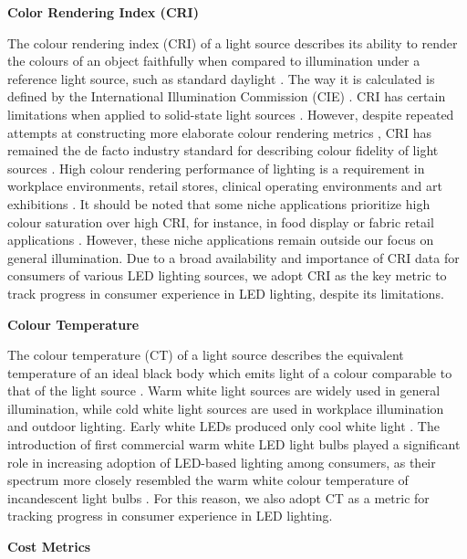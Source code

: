 \documentclass[parskip=full]{article}
\begin{document}
\textbf{Color Rendering Index (CRI)}

The colour rendering index (CRI) of a light source describes its ability to render the colours of an object faithfully when compared to illumination under a reference light source, such as standard daylight \cite{khan2015led}. The way it is calculated is defined by the International Illumination Commission (CIE) \cite{cie_cri_1995}. CRI has certain limitations when applied to solid-state light sources \cite{david2013cri}. However, despite repeated attempts at constructing more elaborate colour rendering metrics \cite{Houser2013}, CRI has remained the de facto industry standard for describing colour fidelity of light sources \cite{DoE2016LED}. High colour rendering performance of lighting is a requirement in workplace environments, retail stores, clinical operating environments and art exhibitions \cite{khanh2017color}. It should be noted that some niche applications prioritize high colour saturation over high CRI, for instance, in food display or fabric retail applications \cite{david2013cri}. However, these niche applications remain outside our focus on general illumination. Due to a broad availability and importance of CRI data for consumers of various LED lighting sources, we adopt CRI as the key metric to track progress in consumer experience in LED lighting, despite its limitations.

\textbf{Colour Temperature}

The colour temperature (CT) of a light source describes the equivalent temperature of an ideal black body which emits light of a colour comparable to that of the light source \cite{commission2011cie}. Warm white light sources are widely used in general illumination, while cold white light sources are used in workplace illumination and outdoor lighting. Early white LEDs produced only cool white light \cite{mueller2000light}. The introduction of first commercial warm white LED light bulbs played a significant role in increasing adoption of LED-based lighting among consumers, as their spectrum more closely resembled the warm white colour temperature of incandescent light bulbs \cite{al2016optics}. For this reason, we also adopt CT as a metric for tracking progress in consumer experience in LED lighting.

\textbf{Cost Metrics}
\end{document}
